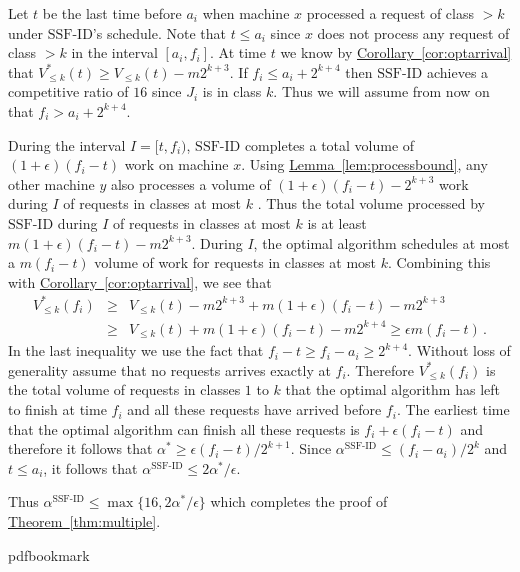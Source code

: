 \documentclass[10pt]{article}
\theoremstyle{definition}
\numberwithin{equation}{section}
\newcommand{\expref}[2]{\texorpdfstring{\hyperref[#2]{#1~\ref{#2}}}{#1~\ref{#2}}}
\newcommand{\eps}{\epsilon}
\newcommand{\Algorithm}[1]{{\textrm{#1}}} %
\newcommand{\mmug}{\Algorithm{SSF-ID}} %
\begin{document}
Let $t$ be the last time before $a_i$ when machine $x$ processed a request
of class $> k$ under $\mmug$'s schedule. Note that $t \leq a_i$ since $x$ does not process any
request of class $> k$ in the interval $[a_i,f_i]$. At time $t$ we
know by \expref{Corollary}{cor:optarrival} that $V^*_{\leq k} (t) \geq
V_{\leq k} (t) - m2^{k+3}$. If $f_i \le a_i + 2^{k+4}$ then $\mmug$
achieves a competitive ratio of $16$ since $J_i$ is in class
$k$. Thus we will assume from now on that $f_i > a_i + 2^{k+4}$.

During the interval $I = [t, f_i)$, $\mmug$ completes a total volume of
$(1 + \eps)(f_i - t)$ work on machine $x$. Using \expref{Lemma}{lem:processbound}, any
other machine $y$ also processes a volume of $(1+\eps)(f_i-t) -
2^{k+3}$ work during $I$ of requests in classes at most $k$ . Thus the total volume processed by $\mmug$ during $I$ of requests in classes at most $ k$ is at least $m(1+\eps)(f_i-t) -
m2^{k+3}$.  During $I$, the optimal algorithm schedules at most a
$m(f_i-t)$ volume of work for requests in classes at most $k$.  Combining this with
\expref{Corollary}{cor:optarrival}, we see that
\begin{eqnarray*}
V^*_{\le k}(f_i) & \ge & V_{\le k}(t) - m2^{k+3} + m(1+\eps)(f_i-t)  - m2^{k+3} \\
  & \ge & V_{\le k}(t) + m(1+\eps)(f_i-t) - m2^{k+4} \ge   \eps m (f_i - t)\,.
\end{eqnarray*}
In the last inequality we use the fact that $f_i-t \ge f_i -
a_i \ge 2^{k+4}$. Without loss of generality assume that no
requests arrives exactly at $f_i$. Therefore $V^*_{\le k}(f_i)$ is the
total volume of requests in classes $1$ to $k$ that the optimal
algorithm has left to finish at time $f_i$ and all these requests have
arrived before $f_i$. The earliest time that the optimal algorithm can
finish all these requests is $f_i + \eps (f_i-t)$ and therefore it
follows that $\alpha^* \ge \eps (f_i - t)/2^{k+1}$. Since $\alpha^\mmug \le (f_i-a_i)/2^k$ and $t \leq a_i$, it follows that $\alpha^\mmug \le 2 \alpha^*/\eps$.

Thus $\alpha^\mmug \le \max\{16, 2\alpha^*/\eps\}$ which completes the proof
of \expref{Theorem}{thm:multiple}.
\clearpage
\begingroup\raggedright
%
%
%
%
%
\providecommand{\bibhead}[1]{}
%
\expandafter\ifx\csname pdfbookmark\endcsname\relax%
  \providecommand{\tocrefpdfbookmark}{}
\else\providecommand{\tocrefpdfbookmark}{%
   \hypertarget{tocreferences}{}%
   \pdfbookmark[1]{References}{tocreferences}}%
\fi
\end{document}
